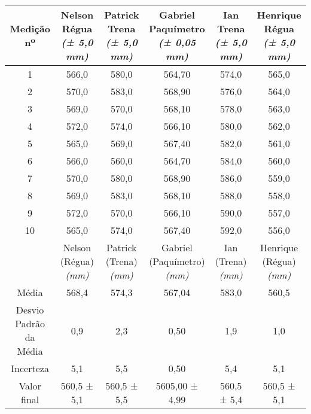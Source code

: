\documentclass{article}
\begin{document}
\begin{table}[h!]
\centering
\begin{tabular}{c c c c c c }
\toprule
Medição nº & \shortstack{Nelson\\Régua\\\textit{(± 5,0 mm)}} & \shortstack{Patrick\\Trena\\\textit{(± 5,0 mm)}} & \shortstack{Gabriel\\Paquímetro\\\textit{(± 0,05 mm)}} & \shortstack{Ian\\Trena\\\textit{(± 5,0 mm)}} & \shortstack{Henrique\\Régua\\\textit{(± 5,0 mm)}}\\
\midrule
1 & 566,0 & 580,0 & 564,70 & 574,0 & 565,0\\
2 & 570,0 & 583,0 & 568,90 & 576,0 & 564,0\\
3 & 569,0 & 570,0 & 568,10 & 578,0 & 563,0\\
4 & 572,0 & 574,0 & 566,10 & 580,0 & 562,0\\
5 & 565,0 & 569,0 & 567,40 & 582,0 & 561,0\\
6 & 566,0 & 560,0 & 564,70 & 584,0 & 560,0\\
7 & 570,0 & 580,0 & 568,90 & 586,0 & 559,0\\
8 & 569,0 & 583,0 & 568,10 & 588,0 & 558,0\\
9 & 572,0 & 570,0 & 566,10 & 590,0 & 557,0\\
10 & 565,0 & 574,0 & 567,40 & 592,0 & 556,0\\
\midrule
&\shortstack{Nelson\\(Régua)\\\textit{(mm)}} & \shortstack{Patrick\\(Trena)\\\textit{(mm)}} & \shortstack{Gabriel\\(Paquímetro)\\\textit{(mm)}} & \shortstack{Ian\\(Trena)\\\textit{(mm)}} & \shortstack{Henrique\\(Régua)\\\textit{(mm)}}\\
\midrule
Média & 568,4 & 574,3 & 567,04 & 583,0 & 560,5\\[3pt]
\shortstack{Desvio\\Padrão da\\Média} & 0,9 & 2,3 & 0,50 & 1,9 & 1,0\\[3pt]
Incerteza & 5,1 & 5,5 & 0,50 & 5,4 & 5,1\\[3pt]
Valor final & 560,5 ± 5,1 & 560,5 ± 5,5 & 5605,00 ± 4,99 & 560,5 ± 5,4 & 560,5 ± 5,1\\[3pt]
\bottomrule
\end{tabular}
\end{table}
\end{document}
